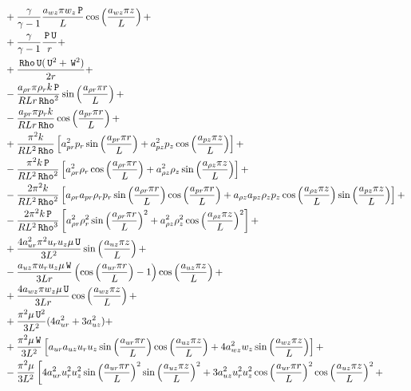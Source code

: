 \documentclass[10pt]{article}
\newcommand{\Rho}{\,\mathtt{Rho}}
\newcommand{\PP}{\,\mathtt{P}}
\newcommand{\U}{\,\mathtt{U}}
\newcommand{\W}{\,\mathtt{W}}
\begin{document}
\begin{equation}
 \begin{split}
 \displaystyle
&+\dfrac{\gamma}{\gamma-1}\dfrac{ a_{wz} \pi w_z \PP}{L} \cos\left(\dfrac{a_{wz} \pi z}{L}\right)+ \\
&+\dfrac{\gamma}{\gamma-1} \dfrac{ \PP \U}{r}+\\
&+\dfrac{ \Rho \U(\U^2+\W^2)}{2r}   +\\
&-\dfrac{a_{\rho r} \pi \rho_r k \PP }{R L r \Rho^2}\sin\left(\dfrac{a_{\rho r} \pi r}{L}\right)+ \\
&-\dfrac{a_{pr} \pi p_r k }{ R L r \Rho}\cos\left(\dfrac{a_{pr} \pi r}{L}\right)+ \\
&+\dfrac{\pi^2 k}{R L^2 \Rho}\left[a_{pr}^2 p_r \sin\left(\dfrac{a_{pr} \pi r}{L}\right)+a_{pz}^2 p_z \cos\left(\dfrac{a_{pz} \pi z}{L}\right)\right] + \\
&-\dfrac{\pi^2 k \PP}{R L^2 \Rho^2}\left[a_{\rho r}^2 \rho_r \cos\left(\dfrac{a_{\rho r} \pi r}{L}\right)+a_{\rho z}^2 \rho_z \sin\left(\dfrac{a_{\rho z} \pi z}{L}\right)\right] + \\
&-\dfrac{2 \pi^2 k}{R L^2 \Rho^2} \left[a_{\rho r} a_{pr} \rho_r p_r \sin\left(\dfrac{a_{\rho r} \pi r}{L}\right) \cos\left(\dfrac{a_{pr} \pi r}{L}\right)+a_{\rho z} a_{pz} \rho_z p_z \cos\left(\dfrac{a_{\rho z} \pi z}{L}\right) \sin\left(\dfrac{a_{pz} \pi z}{L}\right)\right]+ \\
&-\dfrac{2  \pi^2 k \PP}{R L^2 \Rho^3}\left[a_{\rho r}^2 \rho_r^2 \sin\left(\dfrac{a_{\rho r} \pi r}{L}\right)^2+a_{\rho z}^2 \rho_z^2 \cos\left(\dfrac{a_{\rho z} \pi z}{L}\right)^2\right]+\\
&+ \dfrac{4a_{ur}^2 \pi^2 u_r u_z \mu \U}{3L^2} \sin\left(\dfrac{a_{uz} \pi z}{L}\right)+ \\
&-\dfrac{a_{uz} \pi u_r u_z \mu \W }{3Lr} \left( \cos\left(\dfrac{a_{ur} \pi r}{L}\right) -1 \right) \cos\left(\dfrac{a_{uz} \pi z}{L}\right)+ \\
&+\dfrac{4a_{wz} \pi w_z \mu \U }{3Lr} \cos\left(\dfrac{a_{wz} \pi z}{L}\right)+ \\
&+\dfrac{\pi^2 \mu \U^2}{3L^2} (4 a_{ur}^2+3 a_{uz}^2) + \\
&+\dfrac{ \pi^2 \mu \W}{3L^2} \left[a_{ur} a_{uz} u_r u_z \sin\left(\dfrac{a_{ur} \pi r}{L}\right) \cos\left(\dfrac{a_{uz} \pi z}{L}\right)+4 a_{wz}^2 w_z \sin\left(\dfrac{a_{wz} \pi z}{L}\right)\right]+ \\
&-\dfrac{\pi^2 \mu}{3L^2} \left[4 a_{ur}^2 u_r^2 u_z^2 \sin\left(\dfrac{a_{ur} \pi r}{L}\right)^2 \sin\left(\dfrac{a_{uz} \pi z}{L}\right)^2+3 a_{uz}^2 u_r^2 u_z^2 \cos\left(\dfrac{a_{ur} \pi r}{L}\right)^2 \cos\left(\dfrac{a_{uz} \pi z}{L}\right)^2+\right.\\

\end{split}
\end{equation}
\end{document}
